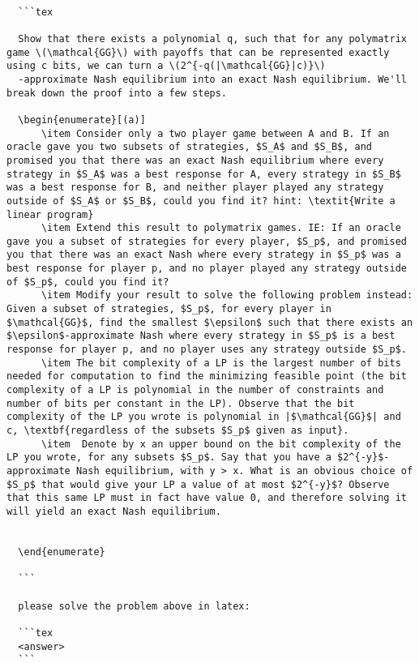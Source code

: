 \documentclass{article}
\begin{document}
\begin{lstlisting}[style=mystyle, caption=Homework 1 Problem 3 Prompts, label=lst:python]

  ```tex

  Show that there exists a polynomial q, such that for any polymatrix game \(\mathcal{GG}\) with payoffs that can be represented exactly using c bits, we can turn a \(2^{-q(|\mathcal{GG}|c)}\)
  -approximate Nash equilibrium into an exact Nash equilibrium. We'll break down the proof into a few steps.
  
  \begin{enumerate}[(a)]
      \item Consider only a two player game between A and B. If an oracle gave you two subsets of strategies, $S_A$ and $S_B$, and promised you that there was an exact Nash equilibrium where every strategy in $S_A$ was a best response for A, every strategy in $S_B$ was a best response for B, and neither player played any strategy outside of $S_A$ or $S_B$, could you find it? hint: \textit{Write a linear program}
      \item Extend this result to polymatrix games. IE: If an oracle gave you a subset of strategies for every player, $S_p$, and promised you that there was an exact Nash where every strategy in $S_p$ was a best response for player p, and no player played any strategy outside of $S_p$, could you find it?
      \item Modify your result to solve the following problem instead: Given a subset of strategies, $S_p$, for every player in $\mathcal{GG}$, find the smallest $\epsilon$ such that there exists an $\epsilon$-approximate Nash where every strategy in $S_p$ is a best response for player p, and no player uses any strategy outside $S_p$.
      \item The bit complexity of a LP is the largest number of bits needed for computation to find the minimizing feasible point (the bit complexity of a LP is polynomial in the number of constraints and number of bits per constant in the LP). Observe that the bit complexity of the LP you wrote is polynomial in |$\mathcal{GG}$| and c, \textbf{regardless of the subsets $S_p$ given as input}.
      \item  Denote by x an upper bound on the bit complexity of the LP you wrote, for any subsets $S_p$. Say that you have a $2^{-y}$-approximate Nash equilibrium, with y > x. What is an obvious choice of $S_p$ that would give your LP a value of at most $2^{-y}$? Observe that this same LP must in fact have value 0, and therefore solving it will yield an exact Nash equilibrium.
      
      
  \end{enumerate}
  
  ```
  
  please solve the problem above in latex:
  
  ```tex
  <answer>
  ```

\end{lstlisting}
\end{document}
